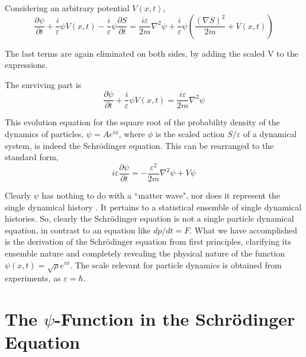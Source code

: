 Considering an arbitrary potential $V (x, t)$,
\begin{equation*}
\frac{\partial \psi}{\partial t} + \frac{i}{\varepsilon} \psi V (x,t) - \frac{i}{\varepsilon} \psi \frac{\partial S}{\partial t} = \frac{i\varepsilon}{2m} \nabla^2 \psi + \frac{i}{\varepsilon} \psi \left( \frac{(\nabla S)^2}{2m} + V (x,t)\right)  \tag{20}
\end{equation*}

The last terms are again eliminated on both sides, by adding the scaled V to the expressions.

The surviving part is
\begin{equation*}
\frac{\partial \psi}{\partial t} + \frac{i}{\varepsilon} \psi V (x,t) = \frac{i \varepsilon}{2m} \nabla^2 \psi \tag{21}
\end{equation*}


This evolution equation for the square root of the probability density of the dynamics of
particles, $\psi = Ae^{i\phi}$, where $\phi$ is the scaled action $S/\varepsilon$ of a dynamical system, is indeed the
Schr\"{o}dinger equation. This can be rearranged to the standard form,
\begin{equation*}
i \varepsilon \frac{\partial \psi}{\partial t} = - \frac{\varepsilon^2}{2m} \nabla^2 \psi + V \psi \tag{22}
\end{equation*}

Clearly $\psi$ has nothing to do with a ``matter wave", nor does it represent the single dynamical
history \cite{chap27-key2}. It pertains to a statistical ensemble of single dynamical histories. So, clearly the
Schr\"{o}dinger equation is not a single particle dynamical equation, in contrast to an equation
like $dp/dt = F$. What we have accomplished is the derivation of the Schr\"{o}dinger equation
from first principles, clarifying its ensemble nature and completely revealing the physical
nature of the function $\psi (x, t) = \sqrt{\rho}e^{i\phi}$. The scale relevant for particle dynamics is obtained
from experiments, as $\varepsilon = \hbar$.

\section{The $\psi$-Function in the Schr\"{o}dinger Equation}%

